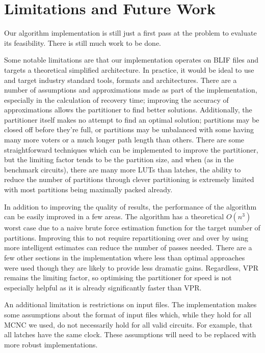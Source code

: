 \documentclass[12pt,final,oneside,a4paper]{dwThesis} %
\begin{document}
   \chapter{Limitations and Future Work}
   Our algorithm implementation is still
   just a first pass at the problem to evaluate its feasibility. There is still
   much work to be done.

   Some notable limitations are that our implementation operates on \gls{BLIF}
   files and targets a theoretical simplified architecture. In practice, it
   would be ideal to use and target industry standard tools, formats and
   architectures.  There are a number of assumptions and approximations made as
   part of the implementation, especially in the calculation of recovery time;
   improving the accuracy of approximations allows the partitioner to find
   better solutions. Additionally, the partitioner itself makes no attempt to
   find an optimal solution; partitions may be closed off before they're full,
   or partitions may be unbalanced with some having many more voters or a much
   longer path length than others.
   There are some straightforward techniques which can be implemented to improve the partitioner, but the limiting factor tends to be the partition size, and when (as in
   the benchmark circuits), there are many more \glspl{LUT} than latches, the
   ability to reduce the number of partitions through clever partitioning is
   extremely limited with most partitions being maximally packed already.
   
   In addition to improving the quality of results, the performance of the algorithm can be easily improved in a few areas.
   The algorithm has a theoretical $O(n^3)$ worst case due to a naive brute force estimation function for the target number of partitions.
   Improving this to not require repartitioning over and over by using more intelligent estimates can reduce the number of passes needed.
   There are a few other sections in the implementation where less than optimal approaches were used though they are likely to provide less dramatic gains.
   Regardless, \gls{VPR} remains the limiting factor, so optimising the partitioner for speed is not especially helpful as it is already significantly faster than \gls{VPR}.
   
   An additional limitation is restrictions on input files.
   The implementation makes some assumptions about the format of input files which, while they hold for all \gls{MCNC} we used, do not necessarily hold for all valid circuits.
   For example, that all latches have the same clock.
   These assumptions will need to be replaced with more robust implementations.
\end{document}
